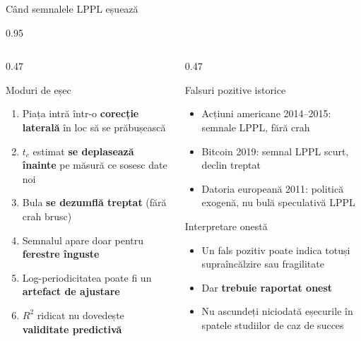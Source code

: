 \documentclass[9pt, aspectratio=169, t]{beamer}
\begin{document}
\begin{frame}{Când semnalele LPPL eșuează}
    \begin{cminipage}{0.95\textwidth}
    {\scriptsize
    \begin{columns}[T]
        \begin{column}{0.47\textwidth}
            \begin{alertblock}{Moduri de eșec}
                \begin{enumerate}\setlength{\itemsep}{0pt}
                    \item Piața intră într-o \textbf{corecție laterală} în loc să se prăbușească
                    \item $t_c$ estimat \textbf{se deplasează înainte} pe măsură ce sosesc date noi
                    \item Bula \textbf{se dezumflă treptat} (fără crah brusc)
                    \item Semnalul apare doar pentru \textbf{ferestre înguste}
                    \item Log-periodicitatea poate fi un \textbf{artefact de ajustare}
                    \item $R^2$ ridicat nu dovedește \textbf{validitate predictivă}
                \end{enumerate}
            \end{alertblock}
        \end{column}
        \begin{column}{0.47\textwidth}
            \begin{alertblock}{Falsuri pozitive istorice}
                \begin{itemize}\setlength{\itemsep}{0pt}
                    \item Acțiuni americane 2014--2015: semnale LPPL, fără crah
                    \item Bitcoin 2019: semnal LPPL scurt, declin treptat
                    \item Datoria europeană 2011: politică exogenă, nu bulă speculativă LPPL
                \end{itemize}
            \end{alertblock}

            \begin{block}{Interpretare onestă}
                \begin{itemize}\setlength{\itemsep}{0pt}
                    \item Un fals pozitiv poate indica totuși supraîncălzire sau fragilitate
                    \item Dar \textbf{trebuie raportat onest}
                    \item Nu ascundeți niciodată eșecurile în spatele studiilor de caz de succes
                \end{itemize}
            \end{block}
        \end{column}
    \end{columns}
    }
    \end{cminipage}
\end{frame}
\end{document}
